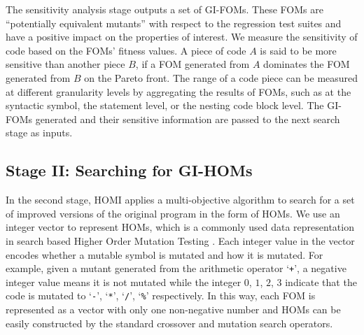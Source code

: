 \documentclass[oribibl]{llncs}
\begin{document}

The sensitivity analysis stage outputs a set of GI-FOMs. These FOMs are ``potentially equivalent mutants'' with respect to the regression test suites and have a positive impact on the properties of interest.  We measure the sensitivity of code based on the FOMs' fitness values.  A piece of code $A$ is said to be more sensitive than another piece $B$, if a FOM generated from $A$ dominates the FOM generated from $B$ on the Pareto front. The range of a code piece can be measured at different granularity levels by aggregating the results of FOMs, such as at the syntactic symbol, the statement level, or the nesting code block level. The GI-FOMs generated and their sensitive information are passed to the next search stage as inputs.





\subsection{Stage II: Searching for GI-HOMs}
\label{sec_hom}

In the second stage, HOMI applies a multi-objective algorithm to search for a set of improved versions of the original program in the form of HOMs. We use an integer vector to represent HOMs, which is a commonly used data representation in search based Higher Order Mutation Testing \cite{Jia20091379}. Each integer value in the vector encodes whether a mutable symbol is mutated and how it is mutated. For example, given a mutant generated from the arithmetic operator `\texttt{+}',  a negative integer value means it is not mutated while the integer $0$, $1$, $2$, $3$ indicate that the code is mutated to `\texttt{-}', `\texttt{*}', `\texttt{/}', `\texttt{\%}' respectively.  In this way, each FOM is represented as a vector with only one non-negative number and HOMs can be easily constructed by the standard crossover and mutation search operators. 
\end{document}
